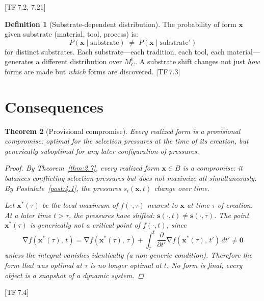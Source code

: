 \documentclass[10pt]{article}
\theoremstyle{definition}
\newtheorem{definition}{Definition}[section]
\theoremstyle{plain}
\newtheorem{theorem}[definition]{Theorem}
\theoremstyle{remark}
\newcommand{\MC}{M^{\mathsf{I}}_C}          %
\DeclareMathOperator{\grad}{\nabla}
\newcommand{\TF}[1]{\textnormal{[TF\,#1]}}  %
\begin{document}
\TF{7.2, 7.21}

\begin{definition}[Substrate-dependent distribution]\label{def:9.5}
The probability of form $\bm{x}$ given substrate (material, tool,
process) is:
\[
  P(\bm{x} \mid \text{substrate}) \;\neq\;
  P(\bm{x} \mid \text{substrate}')
\]
for distinct substrates. Each substrate---each tradition, each tool,
each material---generates a different distribution over $\MC$. A
substrate shift changes not just \emph{how} forms are made but
\emph{which} forms are discovered. \TF{7.3}
\end{definition}


\newpage
\section{Consequences}\label{sec:consequences}

\begin{theorem}[Provisional compromise]\label{thm:10.1}
Every realized form is a \emph{provisional} compromise: optimal for the
selection pressures at the time of its creation, but generically
suboptimal for any later configuration of pressures.

\begin{proof}
By Theorem~\ref{thm:2.7}, every realized form $\bm{x} \in B$ is a
compromise: it balances conflicting selection pressures but does not
maximize all simultaneously. By Postulate~\ref{post:4.1}, the pressures
$s_i(\bm{x}, t)$ change over time.

Let $\bm{x}^*(\tau)$ be the local maximum of
$f(\cdot, \tau)$ nearest to $\bm{x}$ at time $\tau$ of creation. At a
later time $t > \tau$, the pressures have shifted:
$\bm{s}(\cdot, t) \neq \bm{s}(\cdot, \tau)$. The point
$\bm{x}^*(\tau)$ is generically \emph{not} a critical point of
$f(\cdot, t)$, since
\[
  \grad f(\bm{x}^*(\tau),\, t) =
  \grad f(\bm{x}^*(\tau),\, \tau) +
  \int_\tau^t \frac{\partial}{\partial t'} \grad f(\bm{x}^*(\tau),\, t')\, dt'
  \neq \bm{0}
\]
unless the integral vanishes identically (a non-generic condition).
Therefore the form that was optimal at $\tau$ is no longer optimal at $t$.
No form is final; every object is a snapshot of a dynamic system.
\qedhere
\end{proof}
\end{theorem}

\TF{7.4}
\end{document}
